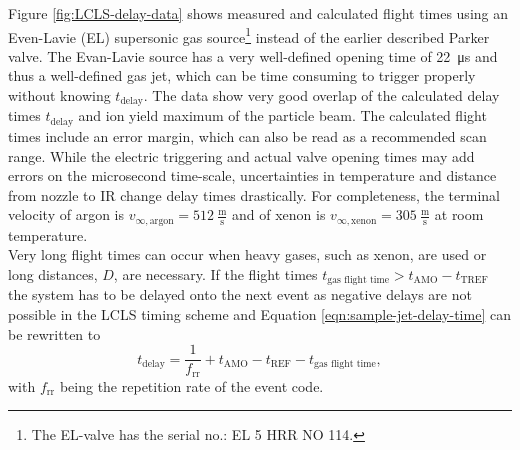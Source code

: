 Figure \ref{fig:LCLS-delay-data} shows measured and calculated flight times using an Even-Lavie (EL) supersonic gas source\footnote{The EL-valve has the serial no.: EL 5 HRR NO 114.} instead of the earlier described Parker valve. The Evan-Lavie source has a very well-defined opening time of \SI{22}{\micro\second} and thus a well-defined gas jet, which can be time consuming to trigger properly without knowing $t_{\text{delay}}$. The data show very good overlap of the calculated delay times $t_{\text{delay}}$ and ion yield maximum of the particle beam. The calculated flight times include an error margin, which can also be read as a recommended scan range. While the electric triggering and actual valve opening times may add errors on the microsecond time-scale, uncertainties in temperature and distance from nozzle to IR change delay times drastically. For completeness, the terminal velocity of argon is $v_{\infty,\text{argon}}=512~\frac{\text{m}}{\text{s}}$ and of xenon is $v_{\infty,\text{xenon}}=305~\frac{\text{m}}{\text{s}}$ at room temperature.\\[1\baselineskip]
%
Very long flight times can occur when heavy gases, such as xenon, are used or long distances, $D$, are necessary. If the flight times $t_{\text{gas flight time}} > t_{\text{AMO}} - t_{\text{TREF}}$ the system has to be delayed onto the next event as negative delays are not possible in the LCLS timing scheme and Equation \eqref{eqn:sample-jet-delay-time} can be rewritten to
\begin{equation}
t_{\text{delay}} = \frac{1}{f_{\text{rr}}}+ t_{\text{AMO}} - t_{\text{REF}} - t_{\text{gas flight time}},
\label{eqn:sample-jet-delay-time-next}
\end{equation}
with $f_{\text{rr}}$ being the repetition rate of the event code.
%
%
%
